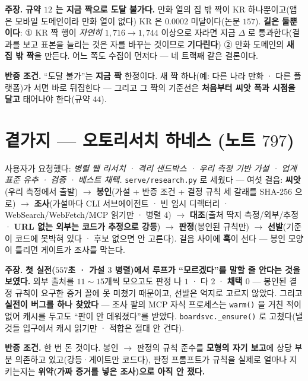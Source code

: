 \documentclass[10pt,a4paper]{article}
\newcommand{\claim}[2]{\begin{claimbox}\textbf{주장.} #1\par\smallskip
  \textcolor{gray!70}{\textbf{반증 조건.} #2}\end{claimbox}}
\begin{document}
\claim{\textbf{규약 $12$ 는 지금 짝으로 도달 불가다.} 만화 열의 집 밖 짝이 KR
하나뿐이고(앱은 모바일 도메인이라 만화 열이 없다) KR 은 $0.0002$ 미달이다(논문
$157$). \textbf{길은 둘뿐이다}: ① KR 짝 행이 \emph{자연히} $1{,}716 \to 1{,}744$
이상으로 자라면 지금 $\Delta$ 로 통과한다(결과를 보고 표본을 늘리는 것은 자를
바꾸는 것이므로 \textbf{기다린다}) ② 만화 도메인의 \textbf{새 집 밖 짝}을 만든다.
어느 쪽도 수집이 먼저다 --- 네 트랙째 같은 결론이다.}
{``도달 불가''는 \textbf{지금 짝} 한정이다. 새 짝 하나(예: 다른 나라 만화 ·
다른 플랫폼)가 서면 바로 뒤집힌다 --- 그리고 그 짝의 기준선은 \textbf{처음부터
씨앗 폭과 시점을 달고} 태어나야 한다(규약 $44$).}

\section{곁가지 --- 오토리서치 하네스 (노트 $797$)}

사용자가 요청했다: \emph{병렬 웹 리서치 · 격리 샌드박스 · 우리 측정 기반 가설 ·
업계 표준 유추 · 검증 · 베스트 채택.} \texttt{serve/research.py} 로 세웠다 ---
여섯 걸음: \textbf{씨앗}(우리 측정에서 출발) $\to$ \textbf{봉인}(가설 + 반증 조건
+ 결정 규칙 세 갈래를 SHA-256 으로) $\to$ \textbf{조사}(가설마다 CLI 서브에이전트
· 빈 임시 디렉터리 · WebSearch/WebFetch/MCP 읽기만 · 병렬 $4$) $\to$
\textbf{대조}(출처 딱지 측정/외부/추정 · \textbf{URL 없는 외부는 코드가 추정으로
강등}) $\to$ \textbf{판정}(봉인된 규칙만) $\to$ \textbf{선발}(기준이 코드에
못박혀 있다 · 후보 없으면 안 고른다). 걸음 사이에 \textbf{훅}이 선다 --- 봉인
모양이 틀리면 게이트가 조사를 막는다.

\claim{\textbf{첫 실전($557$초 · 가설 $3$ 병렬)에서 루프가 ``모르겠다''를 말할 줄
안다는 것을 보였다.} 외부 출처를 $11{\sim}15$개씩 모으고도 판정 나 $1$ · 다 $2$ ·
\textbf{채택 $0$} --- 봉인된 결정 규칙이 요구한 증거 꼴에 못 미쳤기 때문이고,
선발은 억지로 고르지 않았다. 그리고 \textbf{실전이 버그를 하나 찾았다} --- 조사
팔의 MCP 자식 프로세스는 \texttt{warm()} 을 거친 적이 없어 캐시를 두고도 ``판이
안 데워졌다''를 받았다. \texttt{boardsvc.\_ensure()} 로 고쳤다(낼 것들 입구에서
캐시 읽기만 · 적합은 절대 안 건다).}
{한 번 돈 것이다. 봉인 $\to$ 판정의 규칙 준수를 \textbf{모형의 자기 보고}에 상당
부분 의존하고 있고(강등·게이트만 코드다), 판정 프롬프트가 규칙을 실제로 얼마나
지키는지는 \textbf{위약(가짜 증거를 넣은 조사)으로 아직 안 쟀다.}}
\end{document}

